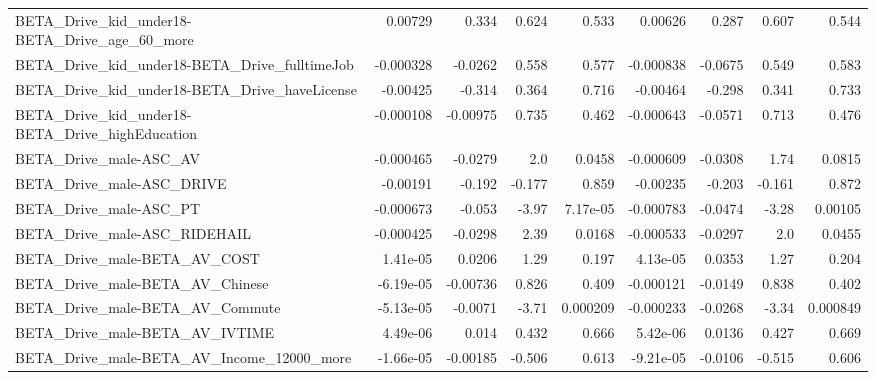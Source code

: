 \begin{tabular}{lrrrrrrrr}
BETA\_Drive\_kid\_under18-BETA\_Drive\_age\_60\_more      &     0.00729 &        0.334 &    0.624 &    0.533 &    0.00626 &       0.287 &        0.607 &         0.544 \\
BETA\_Drive\_kid\_under18-BETA\_Drive\_fulltimeJob      &   -0.000328 &      -0.0262 &    0.558 &    0.577 &  -0.000838 &     -0.0675 &        0.549 &         0.583 \\
BETA\_Drive\_kid\_under18-BETA\_Drive\_haveLicense      &    -0.00425 &       -0.314 &    0.364 &    0.716 &   -0.00464 &      -0.298 &        0.341 &         0.733 \\
BETA\_Drive\_kid\_under18-BETA\_Drive\_highEducation    &   -0.000108 &     -0.00975 &    0.735 &    0.462 &  -0.000643 &     -0.0571 &        0.713 &         0.476 \\
BETA\_Drive\_male-ASC\_AV                             &   -0.000465 &      -0.0279 &      2.0 &   0.0458 &  -0.000609 &     -0.0308 &         1.74 &        0.0815 \\
BETA\_Drive\_male-ASC\_DRIVE                          &    -0.00191 &       -0.192 &   -0.177 &    0.859 &   -0.00235 &      -0.203 &       -0.161 &         0.872 \\
BETA\_Drive\_male-ASC\_PT                             &   -0.000673 &       -0.053 &    -3.97 & 7.17e-05 &  -0.000783 &     -0.0474 &        -3.28 &       0.00105 \\
BETA\_Drive\_male-ASC\_RIDEHAIL                       &   -0.000425 &      -0.0298 &     2.39 &   0.0168 &  -0.000533 &     -0.0297 &          2.0 &        0.0455 \\
BETA\_Drive\_male-BETA\_AV\_COST                       &    1.41e-05 &       0.0206 &     1.29 &    0.197 &   4.13e-05 &      0.0353 &         1.27 &         0.204 \\
BETA\_Drive\_male-BETA\_AV\_Chinese                    &   -6.19e-05 &     -0.00736 &    0.826 &    0.409 &  -0.000121 &     -0.0149 &        0.838 &         0.402 \\
BETA\_Drive\_male-BETA\_AV\_Commute                    &   -5.13e-05 &      -0.0071 &    -3.71 & 0.000209 &  -0.000233 &     -0.0268 &        -3.34 &      0.000849 \\
BETA\_Drive\_male-BETA\_AV\_IVTIME                     &    4.49e-06 &        0.014 &    0.432 &    0.666 &   5.42e-06 &      0.0136 &        0.427 &         0.669 \\
BETA\_Drive\_male-BETA\_AV\_Income\_12000\_more          &   -1.66e-05 &     -0.00185 &   -0.506 &    0.613 &  -9.21e-05 &     -0.0106 &       -0.515 &         0.606 \\

\end{tabular}

